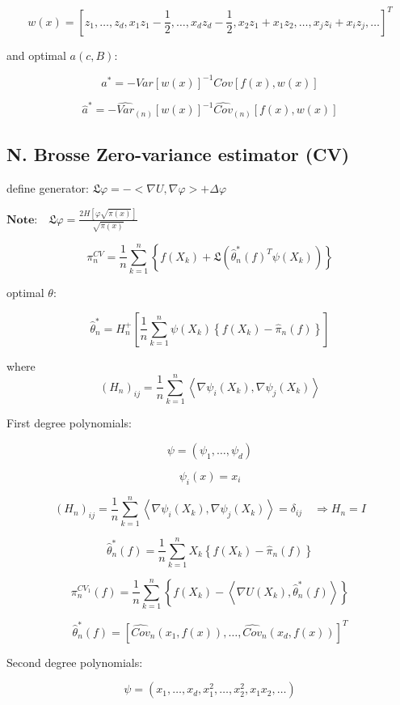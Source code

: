 \documentclass[a4paper]{article}
\begin{document}
$$w(x) = \left[z_1, \dots, z_d, x_1z_1 - \frac{1}{2}, \dots, x_d z_d - \frac{1}{2}, x_2z_1 + x_1z_2, \dots, x_jz_i + x_i z_j, \dots \right]^T $$

and optimal $a (c,B)$:

$$a^* = - Var \left[w(x) \right]^{-1} Cov \left[f(x), w(x) \right]$$

$$\hat{a}^* = - \hat{Var}_{(n)} \left[w(x) \right]^{-1} \hat{Cov}_{(n)} \left[f(x), w(x) \right]$$

\subsection{N. Brosse Zero-variance estimator (CV)}
define generator: $ \mathfrak{L} \varphi = - <\nabla U, \nabla \varphi> + \Delta \varphi$ 

$\textbf{Note:}\quad \mathfrak{L}\varphi = \frac{2H\left[ \varphi \sqrt{\pi(x)}\right]}{\sqrt{\pi(x)}}$

$$\pi_n^{CV} = \frac{1}{n} \sum_{k=1}^n \left\{ f(X_k) + \mathfrak{L} \left( \hat{\theta}^{*}_n(f)^T \psi (X_k)\right)\right\}$$

optimal $\theta$:

$$\hat{\theta}^{*}_n = H_n^{+} \left[ \frac{1}{n} \sum_{k=1}^n\psi(X_k) \left\{ f(X_k) - \hat{\pi}_n(f)\right\} \right]$$

where
$$ (H_n)_{ij} = \frac{1}{n} \sum_{k=1}^n \left< \nabla \psi_i (X_k), \nabla \psi_j (X_k)\right>$$

 First degree polynomials:

$$\psi = (\psi_1, \dots, \psi_d)$$

$$\psi_i(x) = x_i$$

$$(H_n)_{ij} = \frac{1}{n} \sum_{k=1}^n \left< \nabla \psi_i(X_k), \nabla \psi_j(X_k)\right> = \delta_{ij} \quad \Rightarrow H_n = I$$ 

$$\hat{\theta}^{*}_n (f) = \frac{1}{n} \sum_{k=1}^n X_k \left\{ f(X_k) - \hat{\pi}_n(f)\right\}$$

$$\pi_n^{CV_1} (f) = \frac{1}{n} \sum_{k=1}^n \left\{ f(X_k) - \left< \nabla U(X_k), \hat{\theta}^{*}_n (f)\right>\right\}$$

$$\hat{\theta}^{*}_n (f) = \left[ \hat{Cov}_n(x_1, f(x)), \dots, \hat{Cov}_n(x_d, f(x)) \right]^T$$

 Second degree polynomials:

$$\psi = \left(x_1, \dots, x_d, x_1^2, \dots, x_2^2, x_1x_2, \dots \right)$$
\end{document}
